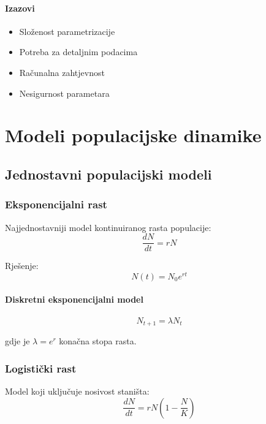 \documentclass[12pt,a4paper,twoside]{book}
\begin{document}
	\subsection{Izazovi}
	\begin{itemize}
		\item Složenost parametrizacije
		\item Potreba za detaljnim podacima
		\item Računalna zahtjevnost
		\item Nesigurnost parametara
	\end{itemize}
	
	\part{Modeli populacijske dinamike}
	
	\chapter{Jednostavni populacijski modeli}
	
	\section{Eksponencijalni rast}
	
	Najjednostavniji model kontinuiranog rasta populacije:
	\begin{equation}
		\frac{dN}{dt} = rN
	\end{equation}
	
	Rješenje:
	\begin{equation}
		N(t) = N_0 e^{rt}
	\end{equation}
	
	\subsection{Diskretni eksponencijalni model}
	\begin{equation}
		N_{t+1} = \lambda N_t
	\end{equation}
	
	gdje je $\lambda = e^r$ konačna stopa rasta.
	
	\section{Logistički rast}
	
	Model koji uključuje nosivost staništa:
	\begin{equation}
		\frac{dN}{dt} = rN\left(1 - \frac{N}{K}\right)
	\end{equation}
	
\end{document}
